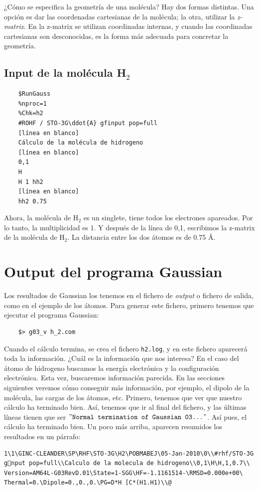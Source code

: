 \documentclass{tufte-book}
\begin{document}
¿Cómo se especifica la geometría de una molécula? Hay dos formas
distintas. Una opción es dar las coordenadas cartesianas de la
molécula; la otra, utilizar la \textit{z-matrix}. En la z-matrix 
se utilizan coordinadas internas, y cuando las coordinadas
cartesianas son desconocidas, es la forma más adecuada para
concretar la geometría.

\subsection{Input de la molécula H$_2$}
\begin{verbatim}
    $RunGauss
    %nproc=1
    %Chk=h2
    #ROHF / STO-3G\ddot{A} gfinput pop=full
    [línea en blanco]
    Cálculo de la molécula de hidrogeno 
    [línea en blanco] 
    0,1
    H
    H 1 hh2
    [línea en blanco]
    hh2 0.75
\end{verbatim}

Ahora, la molécula de H$_2$ es un singlete, tiene todos los
electrones apareados. Por lo tanto, la multiplicidad es 1. Y después de la línea de 0,1, escribimos la z-matrix de la molécula de H$_2$. La distancia entre los dos átomos es de 0.75 {\AA}.

\section{Output del programa Gaussian}
Los resultados de Gaussian los tenemos en el fichero de
\textit{output} o fichero de salida, como en el ejemplo de los
átomos. Para generar este fichero, primero tenemos que ejecutar
el programa Gaussian:
\begin{verbatim}
    $> g03_v h_2.com
\end{verbatim}

Cuando el cálculo termina, se crea el fichero \texttt{h2.log}, 
y en este fichero aparecerá toda la información. ¿Cuál es la
información que nos interesa? En el caso del átomo de hidrogeno
buscamos la energía electrónica y la configuración electrónica.
Esta vez, buscaremos información parecida. En las secciones
siguientes veremos cómo conseguir más información, por ejemplo, 
el dipolo de la molécula, las cargas de los átomos, etc. Primero,
tenemos que ver que nuestro cálculo ha terminado bien. Así, 
tenemos que ir al final del fichero, y las últimas líneas tienen
que ser $"\texttt{Normal termination of Gaussian 03...}"$. Así
pues, el cálculo ha terminado bien. Un poco más arriba, aparecen
resumidos los resultados en un párrafo:
\begin{small}
\begin{verbatim}
1\1\GINC-CLEANDER\SP\RHF\STO-3G\H2\POBMABEJ\05-Jan-2010\0\\#rhf/STO-3G
gnput pop=full\\Calculo de la molecula de hidrogeno\\0,1\H\H,1,0.7\\
Version=AM64L-G03RevD.01\State=1-SGG\HF=-1.1161514-\RMSD=0.000e+00\
Thermal=0.\Dipole=0.,0.,0.\PG=D*H [C*(H1.H1)\\@
\end{verbatim}
\end{small}
\end{document}
